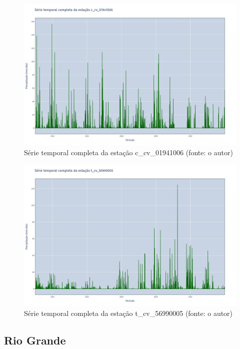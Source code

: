 \begin{figure}[!h]
\centering
\includegraphics[scale=0.25]{Figuras/rio_doce/doceSerieCompleta_c_cv_01941006.png}
\caption{Série temporal completa da estação c\_cv\_01941006 (fonte: o autor)}
\label{fig:doceSerieCompleta_c_cv_01941006}
\end{figure}

\begin{figure}[!h]
\centering
\includegraphics[scale=0.25]{Figuras/rio_doce/doceSerieCompleta_t_cv_56990005.png}
\caption{Série temporal completa da estação t\_cv\_56990005 (fonte: o autor)}
\label{fig:doceSerieCompleta_t_cv_56990005}
\end{figure}

\subsection{Rio Grande}

